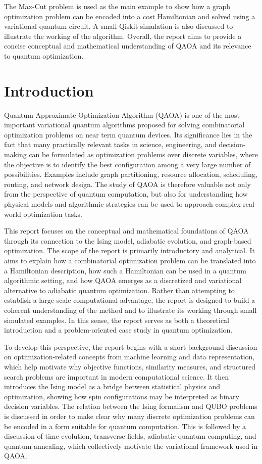 \documentclass[english,12pt,a4paper]{report}
\begin{document}
	The Max-Cut problem is used as the main example to show how a graph optimization problem can be encoded into a cost Hamiltonian and solved using a variational quantum circuit. A small Qiskit simulation is also discussed to illustrate the working of the algorithm. Overall, the report aims to provide a concise conceptual and mathematical understanding of QAOA and its relevance to quantum optimization.
	
	\tableofcontents
	\newpage
	\chapter{Introduction}
	\hspace{1.15em}Quantum Approximate Optimization Algorithm (QAOA) is one of the most important variational quantum algorithms proposed for solving combinatorial optimization problems on near term quantum devices. Its significance lies in the fact that many practically relevant tasks in science, engineering, and decision-making can be formulated as optimization problems over discrete variables, where the objective is to identify the best configuration among a very large number of possibilities. Examples include graph partitioning, resource allocation, scheduling, routing, and network design. The study of QAOA is therefore valuable not only from the perspective of quantum computation, but also for understanding how physical models and algorithmic strategies can be used to approach complex real-world optimization tasks. 
	
	This report focuses on the conceptual and mathematical foundations of QAOA through its connection to the Ising model, adiabatic evolution, and graph-based optimization. The scope of the report is primarily introductory and analytical. It aims to explain how a combinatorial optimization problem can be translated into a Hamiltonian description, how such a Hamiltonian can be used in a quantum algorithmic setting, and how QAOA emerges as a discretized and variational alternative to adiabatic quantum optimization. Rather than attempting to establish a large-scale computational advantage, the report is designed to build a coherent understanding of the method and to illustrate its working through small simulated examples. In this sense, the report serves as both a theoretical introduction and a problem-oriented case study in quantum optimization.
	
	To develop this perspective, the report begins with a short background discussion on optimization-related concepts from machine learning and data representation, which help motivate why objective functions, similarity measures, and structured search problems are important in modern computational science. It then introduces the Ising model as a bridge between statistical physics and optimization, showing how spin configurations may be interpreted as binary decision variables. The relation between the Ising formalism and QUBO problems is discussed in order to make clear why many discrete optimization problems can be encoded in a form suitable for quantum computation. This is followed by a discussion of time evolution, transverse fields, adiabatic quantum computing, and quantum annealing, which collectively motivate the variational framework used in QAOA.
	
\end{document}
